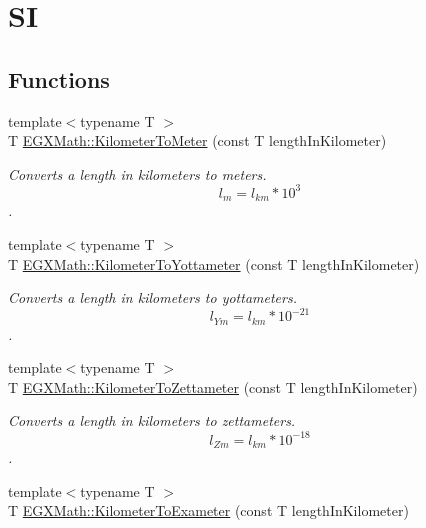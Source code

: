 \hypertarget{group___e_g_x_math-_conversions-_length_conversions-_kilometer-_s_i}{}\section{SI}
\label{group___e_g_x_math-_conversions-_length_conversions-_kilometer-_s_i}
\subsection*{Functions}
\begin{DoxyCompactItemize}
\item 
{\footnotesize template$<$typename T $>$ }\\T \mbox{\hyperlink{group___e_g_x_math-_conversions-_length_conversions-_kilometer-_s_i_ga0c3c04124b670e73baa39fb7c9ed5846}{E\+G\+X\+Math\+::\+Kilometer\+To\+Meter}} (const T length\+In\+Kilometer)
\begin{DoxyCompactList}\small\item\em Converts a length in kilometers to meters. \[ l_{m}=l_{km} * 10^{3} \]. \end{DoxyCompactList}\item 
{\footnotesize template$<$typename T $>$ }\\T \mbox{\hyperlink{group___e_g_x_math-_conversions-_length_conversions-_kilometer-_s_i_gaf29070fac412b7a92466866b2ae32337}{E\+G\+X\+Math\+::\+Kilometer\+To\+Yottameter}} (const T length\+In\+Kilometer)
\begin{DoxyCompactList}\small\item\em Converts a length in kilometers to yottameters. \[ l_{Ym}=l_{km} * 10^{-21} \]. \end{DoxyCompactList}\item 
{\footnotesize template$<$typename T $>$ }\\T \mbox{\hyperlink{group___e_g_x_math-_conversions-_length_conversions-_kilometer-_s_i_ga85792ebcdaa5c8289da781417c88963d}{E\+G\+X\+Math\+::\+Kilometer\+To\+Zettameter}} (const T length\+In\+Kilometer)
\begin{DoxyCompactList}\small\item\em Converts a length in kilometers to zettameters. \[ l_{Zm}=l_{km} * 10^{-18} \]. \end{DoxyCompactList}\item 
{\footnotesize template$<$typename T $>$ }\\T \mbox{\hyperlink{group___e_g_x_math-_conversions-_length_conversions-_kilometer-_s_i_gae947c63c1b914d80d7ed3b35df15d02a}{E\+G\+X\+Math\+::\+Kilometer\+To\+Exameter}} (const T length\+In\+Kilometer)

\end{DoxyCompactItemize}
